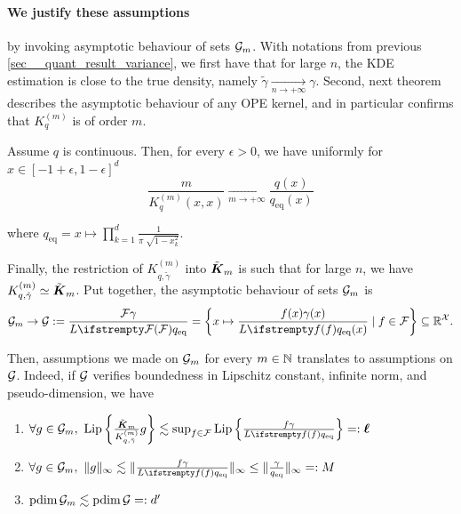 \paragraph{We justify these assumptions} by invoking asymptotic behaviour of sets $\mathcal{G}_m$. With notations from previous \cref{sec__quant_result_variance}, we first have that for large $n$, the KDE estimation is close to the true density, namely $\tilde \gamma \xrightarrow[n \to +\infty]{} \gamma$. Second, next theorem describes the asymptotic behaviour of any OPE kernel, and in particular confirms that $K_q^{(m)}$ is of order $m$.
\begin{tcolorbox}
	\begin{theorem}
		Assume $q$ is continuous. Then, for every $\epsilon>0$, we have uniformly for $x\in [-1+\epsilon,1-\epsilon]^d$
		\begin{equation}
			\frac{m}{K_q^{(m)}(x, x)} \xrightarrow[m \to +\infty]{} \frac{q(x)}{q_{\mathrm{eq}}(x)}
		\end{equation}
	\end{theorem}
	where $q_{\mathrm{eq}} = x \mapsto \prod_{k=1}^d \frac{1}{\pi \sqrt[]{1-x_k^2}}$.
\end{tcolorbox}

Finally, the restriction of $K^{(m)}_{q, \tilde \gamma}$ into $\tilde{\boldsymbol K}_{m}$ is such that for large $n$, we have $K^{(m)}_{q, \tilde \gamma} \simeq \tilde{\boldsymbol K}_{m}$. Put together, the asymptotic behaviour of sets $\mathcal{G}_m$ is 
\begin{equation}
	\twoqset_m \to \twoqset := \frac{\qset\gamma}{\loss{\qset}q_{\mathrm{eq}}} = \left\{x \mapsto \frac{\query(x)\gamma(x)}{\loss{\query}q_{\mathrm{eq}}(x)} \mid \query \in \qset\right\} \subseteq \RR^{\mathcal{X}}.
\end{equation}


 Then, assumptions we made on $\mathcal{G}_m$ for every $m\in \mathbb{N}$ translates to assumptions on $\mathcal{G}$. Indeed, if $\mathcal{G}$ verifies boundedness in Lipschitz constant, infinite norm, and pseudo-dimension, we have
\begin{enumerate}
	\item $\forall \twoquery \in \twoqset_m,\ \operatorname{Lip}\left\{\frac{\opekernel{m}}{K^{(m)}_{q, \tilde \gamma}}\twoquery \right\} \lesssim \sup_{\query \in \qset}\operatorname{Lip}\left\{\frac{\query\gamma}{\loss{\query}q_{\mathrm{eq}}} \right\} =: \lipschitz$
	\item $\forall \twoquery \in \twoqset_m,\ \|\twoquery\|_{\infty} \lesssim \|\frac{\query\gamma}{\loss{\query}q_{\mathrm{eq}}}\|_{\infty} \leq \|\frac{\gamma}{q_{\mathrm{eq}}}\|_{\infty} =:  \bound$
	\item $\operatorname{pdim}\mathcal{G}_m \lesssim \operatorname{pdim}\mathcal{G} =: {d'}$
\end{enumerate}


